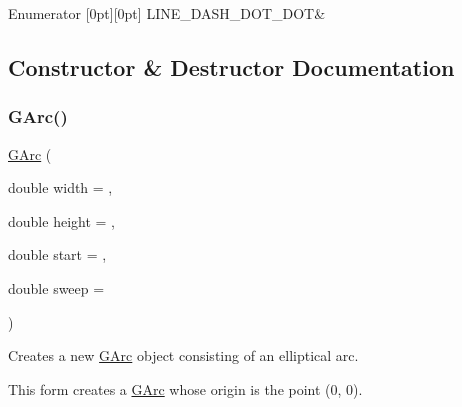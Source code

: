 \begin{DoxyEnumFields}{Enumerator}
[0pt][0pt]{}\mbox{\label{classsgl_1_1GObject_a86e0f5648542856159bb40775c854aa7aabf4053a73eafa7ba2b7e6d664c74c1d}} 
L\+I\+N\+E\+\_\+\+D\+A\+S\+H\+\_\+\+D\+O\+T\+\_\+\+D\+OT&\\
\hline

\end{DoxyEnumFields}


\subsection{Constructor \& Destructor Documentation}
\mbox{\label{classsgl_1_1GArc_a487e2cfaa2231c74bb71eb4ba5bc0167}} 
\subsubsection{\texorpdfstring{G\+Arc()}{GArc()}\hspace{0.1cm}{\footnotesize\ttfamily [1/2]}}
{\footnotesize\ttfamily \mbox{\hyperlink{classsgl_1_1GArc}{G\+Arc}} (\begin{DoxyParamCaption}\item[{double}]{width = {},  }\item[{double}]{height = {},  }\item[{double}]{start = {},  }\item[{double}]{sweep = {} }\end{DoxyParamCaption})}



Creates a new {\ttfamily \mbox{\hyperlink{classsgl_1_1GArc}{G\+Arc}}} object consisting of an elliptical arc. 

This form creates a {\ttfamily \mbox{\hyperlink{classsgl_1_1GArc}{G\+Arc}}} whose origin is the point (0, 0). \mbox{\label{classsgl_1_1GArc_ab70a642a06382d436427bd2f9519539a}} 
